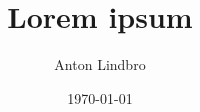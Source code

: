 \documentclass[a4paper]{article}
\title{Lorem ipsum}
\author{Anton Lindbro}
\date{\today}
\begin{document}
\maketitle

\cite[text]{mek_KFbok}
\end{document}
